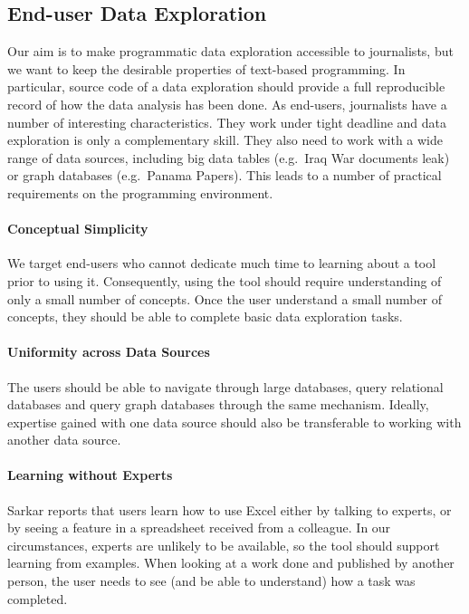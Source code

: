 \documentclass[manuscript,review,anonymous]{acmart}
\begin{document}
\subsection{End-user Data Exploration}
Our aim is to make programmatic data exploration accessible to journalists, but we want to keep
the desirable properties of text-based programming. In particular, source code of a data
exploration should provide a full reproducible record of how the data analysis has been done.
As end-users, journalists have a number of interesting characteristics. They work under tight
deadline and data exploration is only a complementary skill. They also need to work with a wide
range of data sources, including big data tables (e.g.~Iraq War documents leak) or graph
databases (e.g.~Panama Papers). This leads to a number of practical requirements on the programming
environment.

\paragraph{Conceptual Simplicity}
We target end-users who cannot dedicate much time to learning about a tool prior
to using it. Consequently, using the tool should require understanding of only a small number
of concepts. Once the user understand a small number of concepts, they should be able to complete
basic data exploration tasks.

\paragraph{Uniformity across Data Sources}
The users should be able to navigate through large databases, query relational databases and
query graph databases through the same mechanism. Ideally, expertise gained with one data source
should also be transferable to working with another data source.

\paragraph{Learning without Experts}
Sarkar \cite{learning} reports that users learn how to use Excel either by talking to experts,
or by seeing a feature in a spreadsheet received from a colleague. In our circumstances, experts
are unlikely to be available, so the tool should support learning from examples. When looking at
a work done and published by another person, the user needs to see (and be able to understand)
how a task was completed.
\end{document}
